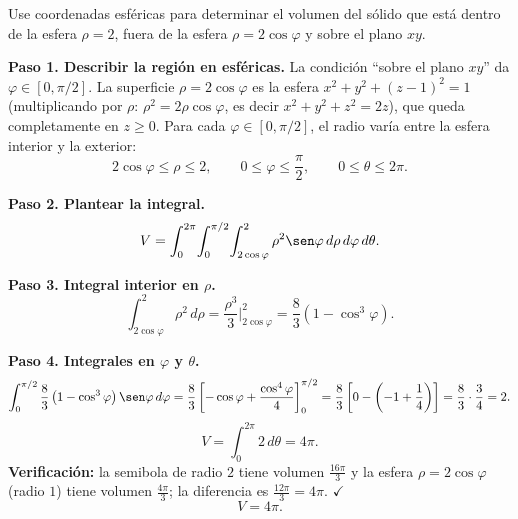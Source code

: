 \begin{prob}
Use coordenadas esféricas para determinar el volumen del sólido que está dentro de la esfera $\rho=2$, fuera de la esfera $\rho=2\cos\varphi$ y sobre el plano $xy$.
\begin{myproof}
\textbf{Paso 1. Describir la región en esféricas.}
La condición ``sobre el plano $xy$'' da $\varphi\in[0,\pi/2]$. La superficie $\rho=2\cos\varphi$ es la esfera $x^2+y^2+(z-1)^2=1$ (multiplicando por $\rho$: $\rho^2=2\rho\cos\varphi$, es decir $x^2+y^2+z^2=2z$), que queda completamente en $z\ge0$. Para cada $\varphi\in[0,\pi/2]$, el radio varía entre la esfera interior y la exterior:
\[
2\cos\varphi\le\rho\le2,\qquad 0\le\varphi\le\frac{\pi}{2},\qquad 0\le\theta\le2\pi.
\]

\textbf{Paso 2. Plantear la integral.}
\[
V=\int_0^{2\pi}\!\int_0^{\pi/2}\!\int_{2\cos\varphi}^{2}\rho^2\sen\varphi\,d\rho\,d\varphi\,d\theta.
\]

\textbf{Paso 3. Integral interior en $\rho$.}
\[
\int_{2\cos\varphi}^{2}\rho^2\,d\rho
=\frac{\rho^3}{3}\Big|_{2\cos\varphi}^{2}
=\frac{8}{3}\left(1-\cos^3\varphi\right).
\]

\textbf{Paso 4. Integrales en $\varphi$ y $\theta$.}
\[
\int_0^{\pi/2}\frac{8}{3}\left(1-\cos^3\varphi\right)\sen\varphi\,d\varphi
=\frac{8}{3}\left[-\cos\varphi+\frac{\cos^4\varphi}{4}\right]_0^{\pi/2}
=\frac{8}{3}\left[0-\left(-1+\frac{1}{4}\right)\right]
=\frac{8}{3}\cdot\frac{3}{4}=2.
\]
\[
V=\int_0^{2\pi}2\,d\theta=4\pi.
\]
\textbf{Verificación:} la semibola de radio $2$ tiene volumen $\tfrac{16\pi}{3}$ y la esfera $\rho=2\cos\varphi$ (radio $1$) tiene volumen $\tfrac{4\pi}{3}$; la diferencia es $\tfrac{12\pi}{3}=4\pi$. $\checkmark$
\[
\boxed{V=4\pi.}
\]
\end{myproof}
\end{prob}

